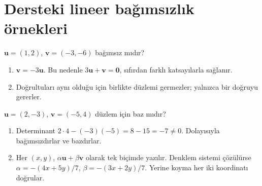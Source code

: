\section{Dersteki lineer bağımsızlık örnekleri}
\begin{tcolorbox}[title={Örnek 1.6 | Düzlemde bağımlı vektörler},colframe=accent]\(\mathbf u=(1,2)\), \(\mathbf v=(-3,-6)\) bağımsız mıdır?
\par{}\end{tcolorbox}
\begin{tcolorbox}[title={Adım adım çözüm},colback=green!3!white,colframe=green]\begin{enumerate}
\item \(\mathbf v=-3\mathbf u\). Bu nedenle \(3\mathbf u+\mathbf v=\mathbf0\), sıfırdan farklı katsayılarla sağlanır.
\item Doğrultuları aynı olduğu için birlikte düzlemi germezler; yalnızca bir doğruyu gererler.
\end{enumerate}\end{tcolorbox}
\begin{tcolorbox}[title={Örnek 1.7 | Düzlemde baz},colframe=accent]\(\mathbf u=(2,-3)\), \(\mathbf v=(-5,4)\) düzlem için baz mıdır?
\par{}\end{tcolorbox}
\begin{tcolorbox}[title={Adım adım çözüm},colback=green!3!white,colframe=green]\begin{enumerate}
\item Determinant \(2\cdot4-(-3)(-5)=8-15=-7\ne0\). Dolayısıyla bağımsızdırlar ve bazdırlar.
\item Her \((x,y)\), \(\alpha\mathbf u+\beta\mathbf v\) olarak tek biçimde yazılır. Denklem sistemi çözülürse \(\alpha=-(4x+5y)/7\), \(\beta=-(3x+2y)/7\). Yerine koyma her iki koordinatı doğrular.
\end{enumerate}\end{tcolorbox}

